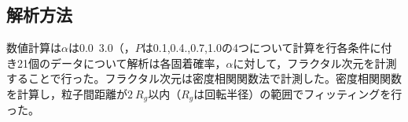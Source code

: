 \documentclass[autodetect-engine,dvi=dvipdfmx,a4paper,ja=standard,oneside,openany,11pt,draft]{bxjsbook}
\begin{document}
\subsection{解析方法}
数値計算は$\alpha$は0.0~3.0（，$P$は0.1,0.4.,0.7,1.0の4つについて計算を行各条件に付き21個のデータについて解析は各固着確率，$\alpha$に対して，フラクタル次元を計測することで行った。フラクタル次元は密度相関関数法で計測した。密度相関関数を計算し，粒子間距離が$2~R_g$以内（$R_g$は回転半径）の範囲でフィッティングを行った。

\ifdraft{
  
  
}{}
\end{document}
